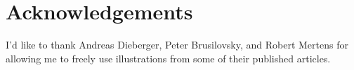 \chapter{Acknowledgements}
I'd like to thank
Andreas Dieberger,
Peter Brusilovsky, and
Robert Mertens
for allowing me to freely use illustrations from
some of their published articles.
